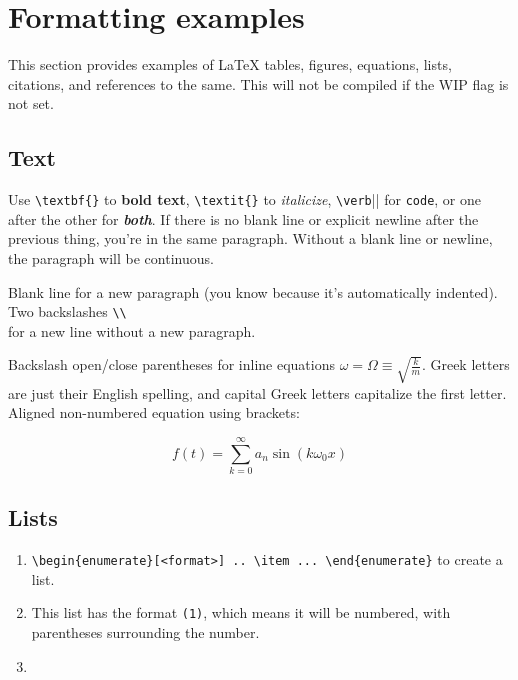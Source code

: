 \section*{Formatting examples}

This section provides examples of \LaTeX{} tables, figures, equations,
lists, citations, and references to the same. This will not be compiled if
the WIP flag is not set.
\subsection*{Text}

Use \verb|\textbf{}| to \textbf{bold text}, \verb|\textit{}| to
\textit{italicize}, \verb|\verb||| for \verb|code|, or one after the other for
\textit{\textbf{both}}.
If there is no blank line or explicit newline after the previous thing, you're
in the same paragraph. Without a blank line or newline, the paragraph will be
continuous.

Blank line for a new paragraph (you know because it's automatically indented).
Two backslashes \verb|\\| \\ for a new line without a new paragraph.

Backslash open/close parentheses for inline equations \(\omega = \Omega \equiv
\sqrt{\frac{k}{m}}\). Greek letters are just their English spelling, and capital
Greek letters capitalize the first letter. Aligned non-numbered equation using
brackets:

\[f(t) = \sum_{k = 0}^{\infty} a_{n} \sin(k\omega_{0}x)\]

\subsection*{Lists}

\begin{enumerate}[(1)]
    \item \verb|\begin{enumerate}[<format>] .. \item ... \end{enumerate}| to create a list. \label{list:examples-head}

    \item This list has the format \verb|(1)|, which means it will be numbered, with parentheses surrounding the number.

    \item 
\end{enumerate}

